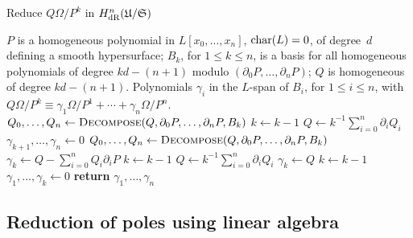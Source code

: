 \begin{algorithm}
\caption{Reduce $Q \Omega / P^k$ in $H_{\text{dR}}^n(\mathfrak{U}/\mathfrak{S})$}
\label{alg:PoleReduction}
\begin{algorithmic}
\vspace{1mm}
\Require $P$ is a homogeneous polynomial in $L[x_0, \dotsc, x_n]$, 
         $\operatorname{char}(L) = 0$, of degree~$d$ defining a smooth hypersurface; 
         $B_k$, for $1 \leq k \leq n$, is a basis for all homogeneous 
         polynomials of degree $kd - (n+1)$ modulo 
         $(\partial_0 P, \dotsc, \partial_n P)$;  $Q$ is homogeneous of 
         degree $kd - (n+1)$.
\Ensure  Polynomials $\gamma_i$ in the $L$-span of $B_i$, 
         for $1 \leq i \leq n$, with  
         $Q \Omega / P^k \equiv \gamma_{1} \Omega / P^{1} + \dotsb + \gamma_n \Omega / P^n$.
\State $Q_0, \dotsc, Q_n \gets \Call{Decompose}{Q, \partial_0 P, \dotsc, \partial_n P, B_k}$
\State $k \gets k-1$
\State $Q \gets k^{-1} \sum_{i=0}^n \partial_i Q_i$
\EndWhile
\State $\gamma_{k+1}, \dotsc, \gamma_{n} \gets 0$
\State $Q_0, \dotsc, Q_n \gets \Call{Decompose}{Q, \partial_0 P, \dotsc, \partial_n P, B_k}$
\State $\gamma_{k} \gets Q - \sum_{i=0}^n Q_i \partial_i P$
\State $k \gets k-1$
\State $Q \gets k^{-1} \sum_{i=0}^n \partial_i Q_i$
\EndWhile
{}
\State $\gamma_{k} \gets Q$
\State $k \gets k-1$
\EndIf
\State $\gamma_{1}, \dotsc, \gamma_{k} \gets 0$
\State \textbf{return} $\gamma_{1}, \dotsc, \gamma_n$
\EndProcedure
\end{algorithmic}
\end{algorithm}


\subsection{Reduction of poles using linear algebra}
\label{sec:01-04-linalg}

